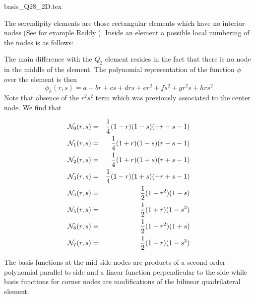 \begin{flushright} {\tiny {\color{gray} basis\_Q28\_2D.tex}} \end{flushright}

The serendipity elements are those rectangular elements which have no
interior nodes (See for example Reddy \cite[p65]{reddybook2}).
Inside an element a possible local numbering of the nodes is as follows:



The main difference with the $Q_2$ element resides in the fact that there is 
no node in the middle of the element.
The polynomial representation of the function $\phi$ over the element is then
\[
\phi_h(r,s) = a + br + cs + drs + er^2 + fs^2 + gr^2s + hrs^2
\]
Note that absence of the $r^2s^2$ term which was previously associated 
to the center node. We find that 
\begin{mdframed}[backgroundcolor=blue!5]
\begin{eqnarray}
{\mathcal{N}}_0(r,s)&=& \frac{1}{4}(1-r)(1-s)(-r-s-1) \\
{\mathcal{N}}_1(r,s)&=& \frac{1}{4}(1+r)(1-s)(r-s-1) \\
{\mathcal{N}}_2(r,s)&=& \frac{1}{4}(1+r)(1+s)(r+s-1) \\
{\mathcal{N}}_3(r,s)&=& \frac{1}{4}(1-r)(1+s)(-r+s-1) \\
{\mathcal{N}}_4(r,s)&=& \frac{1}{2}(1-r^2)(1-s)  \\
{\mathcal{N}}_5(r,s)&=& \frac{1}{2}(1+r)  (1-s^2)\\
{\mathcal{N}}_6(r,s)&=& \frac{1}{2}(1-r^2)(1+s)  \\
{\mathcal{N}}_7(r,s)&=& \frac{1}{2}(1-r)  (1-s^2)
\end{eqnarray}
\end{mdframed}

The basis functions at the mid side nodes are products of a 
second order polynomial parallel to side and 
a linear function perpendicular to the side
while basis functions for corner nodes are modifications of the bilinear
quadrilateral element.

